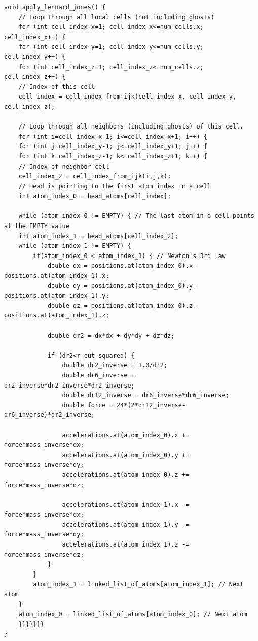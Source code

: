 \begin{lstlisting}[caption=Implementation of the Lennard-Jones force. The code loops over all cells and their neighbors computing the forces between all the atoms in neighboring cells., label=lst:md_lennard_jones]
void apply_lennard_jones() {
    // Loop through all local cells (not including ghosts)
    for (int cell_index_x=1; cell_index_x<=num_cells.x; cell_index_x++) {
    for (int cell_index_y=1; cell_index_y<=num_cells.y; cell_index_y++) {
    for (int cell_index_z=1; cell_index_z<=num_cells.z; cell_index_z++) {
    // Index of this cell
    cell_index = cell_index_from_ijk(cell_index_x, cell_index_y, cell_index_z);

    // Loop through all neighbors (including ghosts) of this cell.
    for (int i=cell_index_x-1; i<=cell_index_x+1; i++) {
    for (int j=cell_index_y-1; j<=cell_index_y+1; j++) {
    for (int k=cell_index_z-1; k<=cell_index_z+1; k++) {
    // Index of neighbor cell
    cell_index_2 = cell_index_from_ijk(i,j,k);
    // Head is pointing to the first atom index in a cell
    int atom_index_0 = head_atoms[cell_index]; 

    while (atom_index_0 != EMPTY) { // The last atom in a cell points at the EMPTY value
    int atom_index_1 = head_atoms[cell_index_2];
    while (atom_index_1 != EMPTY) {
        if(atom_index_0 < atom_index_1) { // Newton's 3rd law
            double dx = positions.at(atom_index_0).x-positions.at(atom_index_1).x;
            double dy = positions.at(atom_index_0).y-positions.at(atom_index_1).y;
            double dz = positions.at(atom_index_0).z-positions.at(atom_index_1).z;
            
            double dr2 = dx*dx + dy*dy + dz*dz;

            if (dr2<r_cut_squared) {
                double dr2_inverse = 1.0/dr2;
                double dr6_inverse = dr2_inverse*dr2_inverse*dr2_inverse;
                double dr12_inverse = dr6_inverse*dr6_inverse;
                double force = 24*(2*dr12_inverse-dr6_inverse)*dr2_inverse;

                accelerations.at(atom_index_0).x += force*mass_inverse*dx;
                accelerations.at(atom_index_0).y += force*mass_inverse*dy;
                accelerations.at(atom_index_0).z += force*mass_inverse*dz;

                accelerations.at(atom_index_1).x -= force*mass_inverse*dx;
                accelerations.at(atom_index_1).y -= force*mass_inverse*dy;
                accelerations.at(atom_index_1).z -= force*mass_inverse*dz;
            }
        }
        atom_index_1 = linked_list_of_atoms[atom_index_1]; // Next atom
    }
    atom_index_0 = linked_list_of_atoms[atom_index_0]; // Next atom
    }}}}}}}
}
\end{lstlisting}
